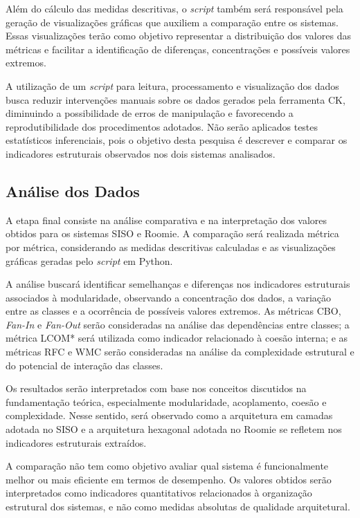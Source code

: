 Além do cálculo das medidas descritivas, o \textit{script} também será responsável pela geração de visualizações gráficas que auxiliem a 
comparação entre os sistemas. Essas visualizações terão como objetivo representar a distribuição dos valores das métricas e facilitar 
a identificação de diferenças, concentrações e possíveis valores extremos.

A utilização de um \textit{script} para leitura, processamento e visualização dos dados busca reduzir intervenções manuais sobre os dados 
gerados pela ferramenta CK, diminuindo a possibilidade de erros de manipulação e favorecendo a reprodutibilidade dos procedimentos 
adotados. Não serão aplicados testes estatísticos inferenciais, pois o objetivo desta pesquisa é descrever e comparar os indicadores 
estruturais observados nos dois sistemas analisados.

\subsection{Análise dos Dados}
\label{subsec:analise-dos-dados}

A etapa final consiste na análise comparativa e na interpretação dos valores obtidos para os sistemas SISO e Roomie. 
A comparação será realizada métrica por métrica, considerando as medidas descritivas calculadas e as visualizações 
gráficas geradas pelo \textit{script} em Python.

A análise buscará identificar semelhanças e diferenças nos indicadores estruturais associados à modularidade, 
observando a concentração dos dados, a variação entre as classes e a ocorrência de possíveis valores extremos. 
As métricas CBO, \textit{Fan-In} e \textit{Fan-Out} serão consideradas na análise das dependências entre classes; a métrica LCOM* 
será utilizada como indicador relacionado à coesão interna; e as métricas RFC e WMC serão consideradas na análise 
da complexidade estrutural e do potencial de interação das classes.

Os resultados serão interpretados com base nos conceitos discutidos na fundamentação teórica, especialmente modularidade, 
acoplamento, coesão e complexidade. Nesse sentido, será observado como a arquitetura em camadas adotada no SISO e a arquitetura 
hexagonal adotada no Roomie se refletem nos indicadores estruturais extraídos.

A comparação não tem como objetivo avaliar qual sistema é funcionalmente melhor ou mais eficiente em termos de desempenho. Os 
valores obtidos serão interpretados como indicadores quantitativos relacionados à organização estrutural dos sistemas, e não 
como medidas absolutas de qualidade arquitetural.


